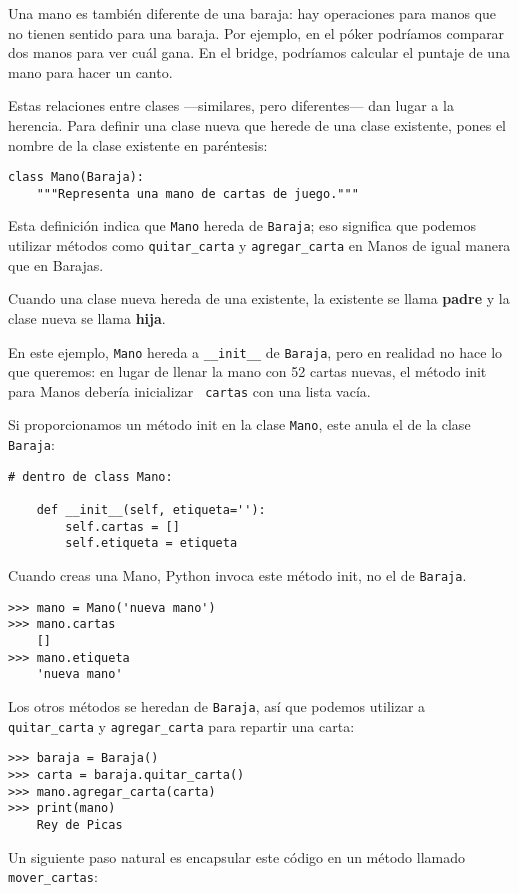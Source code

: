 \documentclass[10pt]{book}
\begin{document}
Una mano es también diferente de una baraja: hay operaciones para
manos que no tienen sentido para una baraja.  Por ejemplo, en el póker
podríamos comparar dos manos para ver cuál gana.  En el bridge, podríamos
calcular el puntaje de una mano para hacer un canto.

Estas relaciones entre clases ---similares, pero diferentes--- dan lugar
a la herencia.
Para definir una clase nueva que herede de una clase existente,
pones el nombre de la clase existente en paréntesis:

\begin{verbatim}
class Mano(Baraja):
    """Representa una mano de cartas de juego."""
\end{verbatim}
%
Esta definición indica que {\tt Mano} hereda de {\tt Baraja};
eso significa que podemos utilizar métodos como \verb"quitar_carta" y \verb"agregar_carta"
en Manos de igual manera que en Barajas.

Cuando una clase nueva hereda de una existente, la existente
se llama {\bf padre} y la clase nueva se
llama {\bf hija}.

En este ejemplo, {\tt Mano} hereda a \verb"__init__" de {\tt Baraja},
pero en realidad no hace lo que queremos: en lugar de llenar la mano
con 52 cartas nuevas, el método init para Manos debería inicializar {\tt
  cartas} con una lista vacía.   

Si proporcionamos un método init en la clase {\tt Mano}, este anula el
de la clase {\tt Baraja}:

\begin{verbatim}
# dentro de class Mano:

    def __init__(self, etiqueta=''):
        self.cartas = []
        self.etiqueta = etiqueta
\end{verbatim}
%
Cuando creas una Mano, Python invoca este método init, no el
de {\tt Baraja}.

\begin{verbatim}
>>> mano = Mano('nueva mano')
>>> mano.cartas
    []
>>> mano.etiqueta
    'nueva mano'
\end{verbatim}
%
Los otros métodos se heredan de {\tt Baraja}, así que podemos utilizar a
\verb"quitar_carta" y \verb"agregar_carta" para repartir una carta:

\begin{verbatim}
>>> baraja = Baraja()
>>> carta = baraja.quitar_carta()
>>> mano.agregar_carta(carta)
>>> print(mano)
    Rey de Picas
\end{verbatim}
%
Un siguiente paso natural es encapsular este código en un método
llamado \verb"mover_cartas":
\end{document}
